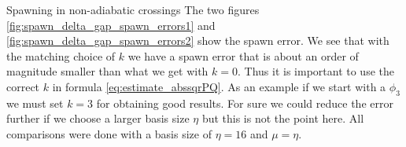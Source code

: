 \begin{chapter}{Spawning in non-adiabatic crossings}
The two figures \ref{fig:spawn_delta_gap_spawn_errors1} and
\ref{fig:spawn_delta_gap_spawn_errors2} show the spawn error. We see that with
the matching choice of $k$ we have a spawn error that is about an order of magnitude
smaller than what we get with $k=0$. Thus it is important to use the correct $k$ in
formula \eqref{eq:estimate_abssqrPQ}. As an example if we start with a $\phi_3$
we must set $k=3$ for obtaining good results. For sure we could reduce the error
further if we choose a larger basis size $\eta$ but this is not the point here.
All comparisons were done with a basis size of $\eta = 16$ and $\mu = \eta$.

\begin{figure}[h!]
  \centering
   \\
\end{figure}
\end{chapter}
